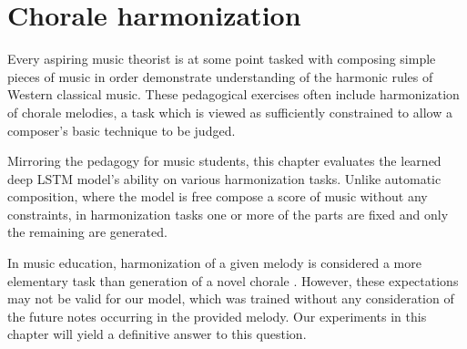 \chapter{Chorale harmonization}\label{ch:harmonization}

\ifpdf
    \graphicspath{{Chapter6/Figs/Raster/}{Chapter6/Figs/PDF/}{Chapter6/Figs/}}
\else
    \graphicspath{{Chapter6/Figs/Vector/}{Chapter6/Figs/}}
\fi

Every aspiring music theorist is at some point tasked with composing simple
pieces of music in order demonstrate understanding of the harmonic rules of
Western classical music. These pedagogical exercises often include
harmonization of chorale melodies, a task which is viewed as sufficiently
constrained to allow a composer's basic technique to be judged.

Mirroring the pedagogy for music students, this chapter evaluates the learned
deep LSTM model's ability on various harmonization tasks. Unlike automatic
composition, where the model is free compose a score of music without any
constraints, in harmonization tasks one or more of the parts are fixed and only
the remaining are generated.

In music education, harmonization of a given melody is considered a more
elementary task than generation of a novel chorale
\cite{denny1960oxford,piston1978harmony}. However, these expectations may not
be valid for our model, which was trained without any consideration of the
future notes occurring in the provided melody. Our experiments in this chapter
will yield a definitive answer to this question.





